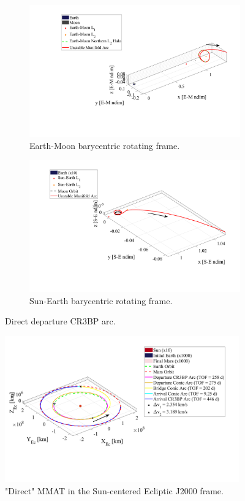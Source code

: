\begin{figure}[ht]
    \begin{subfigure}[h]{0.495\linewidth}
        \includegraphics[width=\textwidth]{figures/DirectEM.pdf}
        \caption{Earth-Moon barycentric rotating frame.}
    \end{subfigure}
    \hfill
    \begin{subfigure}[h]{0.495\linewidth}
        \includegraphics[width=\textwidth]{figures/DirectSE.pdf}
        \caption{Sun-Earth barycentric rotating frame.}
    \end{subfigure}
    \caption{Direct departure CR3BP arc.}
    \label{fig:directE}
\end{figure}

\begin{figure}[ht]
    \centering
    \includegraphics[width=0.9\textwidth]{figures/DirectMMAT.pdf}
    \caption{"Direct" MMAT in the Sun-centered Ecliptic J2000 frame.}
    \label{fig:directMMAT}
\end{figure}

